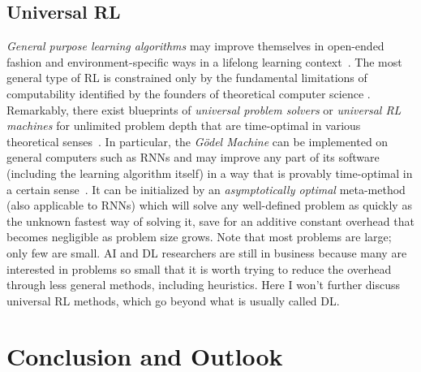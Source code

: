\documentclass[letterpaper]{article}
\begin{document}
\begin{sloppypar}
\subsection{Universal RL}
\label{unirl}


{\em General purpose learning algorithms}
may improve themselves in open-ended fashion
and environment-specific 
ways in a lifelong learning 
context~\citep{schmidhuber87,Schmidhuber:97bias,Schmidhuber:97ssa,scholarpedia2010}. 
The most general type of RL is constrained only by the
fundamental limitations of computability identified by 
the founders of theoretical computer science 
\citep{Goedel:31,Church:36,Turing:36,Post:36}.
Remarkably, there exist blueprints of
 {\em universal problem solvers} or {\em universal RL machines}
for unlimited problem depth 
that are  
time-optimal in various theoretical senses~\citep{Hutter:05book+,Hutter:01fast+,Schmidhuber:02colt,Schmidhuber:05gmai}. 
In particular, the {\em G\"{o}del Machine} can be implemented 
on general computers such as RNNs and may improve 
any part of its software (including the learning algorithm itself)  
in a way that is provably time-optimal in a certain sense~\citep{Schmidhuber:05gmai}. It can be initialized by an 
{\em asymptotically optimal}
meta-method~\citep{Hutter:01fast+} (also applicable to RNNs)
which will solve any well-defined problem as quickly as the unknown fastest way of solving it, save for an additive constant overhead that becomes negligible as problem size grows. Note that most problems are large; only few are small. AI and DL researchers are still in business because many are interested in problems so small that it is worth trying to reduce the overhead through less general methods, including heuristics. Here I won't further discuss universal RL methods, which go beyond what is usually called DL. 

\section{Conclusion and Outlook}
\label{outlook}


\end{sloppypar}
\end{document}
